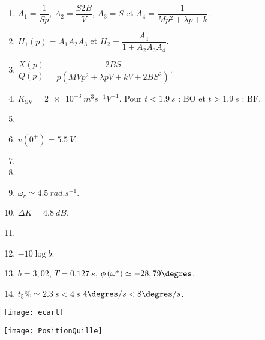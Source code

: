 \ifprof
\else
\footnotesize
\begin{solution}
\begin{enumerate}
\item $A_1=\dfrac{1}{Sp}$,  $A_2 = \dfrac{S2B}{V} $,  $A_3 = S$  et $A_4 = \dfrac{1}{Mp^2  +\lambda p  + k}$.
\item $H_1(p)=A_1  A_2A_3$ et $H_2 = \dfrac{A_4}{1+ A_2A_3A_4 }$.
\item $\dfrac{X(p)}{Q(p)}=\dfrac{2BS}{p\left(MVp^2  +\lambda pV  + kV+ 2BS^2\right) }$.
\item  $K_{\text{SV}} = \SI{2e-3}{m^3 s^{-1}V^{-1}}$. Pour $t<\SI{1,9}{s}$ : BO et  $t>\SI{1,9}{s}$ : BF.
\item 
\item $v(0^{+})=\SI{5,5}{V}$.
\item 
\item 
\item  $\omega_r \simeq \SI{4,5}{rad.s^{-1}}$.
\item $\Delta K = \SI{4,8}{dB}$.
\item 
\item $-10\log b$.
\item  $b=3,02$,  $T=\SI{0,127}{s}$,   $\phi\left(\omega^{*}\right) \simeq -28,79\degres $.
\item $t_5\%\simeq \SI{2,3}{s}<\SI{4}{s}$ $ 4 \degres/s< 8 \degres/s$.
\end{enumerate}
\end{solution}%
\normalsize
\fi

\ifprof
\else

\begin{center}
\texttt{[image: ecart]}
\end{center}

\begin{center}
\texttt{[image: PositionQuille]}
\end{center}

\fi
